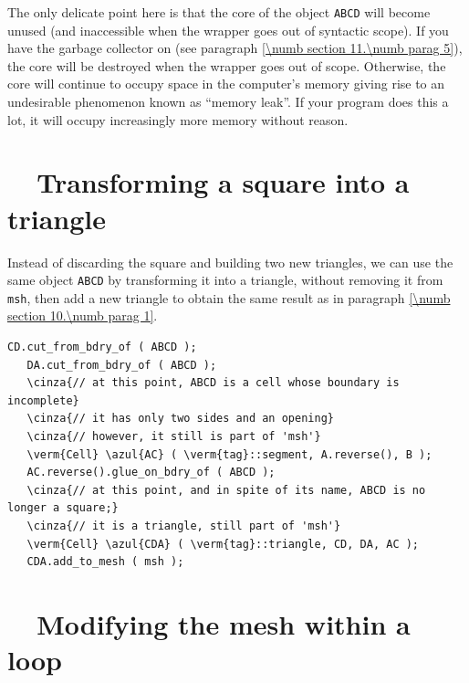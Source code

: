 The only delicate point here is that the core of the {\small\tt{}} object
{\small\tt ABCD}
will become unused (and inaccessible when the wrapper goes out of syntactic scope).
If you have the garbage collector on (see paragraph \ref{\numb section 11.\numb parag 5}),
the core will be destroyed when the wrapper goes out of scope.
Otherwise, the core will continue to occupy space in the computer's memory giving rise
to an undesirable phenomenon known as ``memory leak''.
If your program does this a lot, it will occupy increasingly more memory without reason.


\section{~~Transforming a square into a triangle}\label{\numb section 10.\numb parag 2}

Instead of discarding the square and building two new triangles, we can use the same
{\small\tt{}} object {\small\tt ABCD}
by transforming it into a triangle, without removing it from {\small\tt msh}, then add
a new triangle to obtain the same result as in paragraph \ref{\numb section 10.\numb parag 1}.

\begin{Verbatim}[commandchars=\\\{\},formatcom=\small\tt,frame=single,
   label=main-\ref{\numb section 10.\numb parag 2}.cpp,rulecolor=\color{coment},
   baselinestretch=0.94,framesep=2mm]
   CD.cut_from_bdry_of ( ABCD );
   DA.cut_from_bdry_of ( ABCD );
   \cinza{// at this point, ABCD is a cell whose boundary is incomplete}
   \cinza{// it has only two sides and an opening}
   \cinza{// however, it still is part of 'msh'}
   \verm{Cell} \azul{AC} ( \verm{tag}::segment, A.reverse(), B );
   AC.reverse().glue_on_bdry_of ( ABCD );
   \cinza{// at this point, and in spite of its name, ABCD is no longer a square;}
   \cinza{// it is a triangle, still part of 'msh'}
   \verm{Cell} \azul{CDA} ( \verm{tag}::triangle, CD, DA, AC );
   CDA.add_to_mesh ( msh );
\end{Verbatim}



\section{~~Modifying the mesh within a loop}\label{\numb section 10.\numb parag 3}

